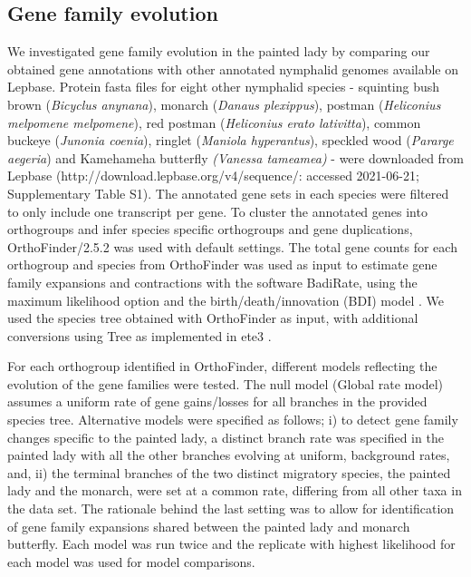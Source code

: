 \documentclass[twocolumn]{bmcart}%
\begin{document}
\subsection*{Gene family evolution}
We investigated gene family evolution in the painted lady by comparing our obtained gene annotations with other annotated nymphalid genomes available on Lepbase. Protein fasta files for eight other nymphalid species - squinting bush brown (\textit{Bicyclus anynana}), monarch (\textit{Danaus plexippus}), postman (\textit{Heliconius melpomene melpomene}), red postman (\textit{Heliconius erato lativitta}), common buckeye (\textit{Junonia coenia}), ringlet (\textit{Maniola hyperantus}), speckled wood (\textit{Pararge aegeria}) and Kamehameha butterfly \textit{(Vanessa tamea\-mea)} - were downloaded from Lepbase (http://down\-load.\-lep\-base.org/v4/sequence/: accessed 2021-06-21; Supplementary Table S1). The annotated gene sets in each species were filtered to only include one transcript per gene. To cluster the annotated genes into orthogroups and infer species specific orthogroups and gene duplications, OrthoFinder/2.5.2 \cite{emmsOrthoFinderPhylogeneticOrthology2019} was used with default settings. The total gene counts for each orthogroup and species from OrthoFinder was used as input to estimate gene family expansions and contractions with the software BadiRate, using the maximum likelihood option and the birth/death/innovation (BDI) model \cite{libradoBadiRateEstimatingFamily2012}. We used the species tree obtained with OrthoFinder as input, with additional conversions using Tree as implemented in ete3 \cite{huerta-cepasETEReconstructionAnalysis2016}. 

For each orthogroup identified in OrthoFinder, different models reflecting the evolution of the gene families were tested. The null model (Global rate model) assumes a uniform rate of gene gains/losses for all branches in the provided species tree. Alternative models were specified as follows; i) to detect gene family changes specific to the painted lady, a distinct branch rate was specified in the painted lady with all the other branches evolving at uniform, background rates, and, ii) the terminal branches of the two distinct migratory species, the painted lady and the monarch, were set at a common rate, differing from all other taxa in the data set. The rationale behind the last setting was to allow for identification of gene family expansions shared between the painted lady and monarch butterfly. Each model was run twice and the replicate with highest likelihood for each model was used for model comparisons.
\end{document}
